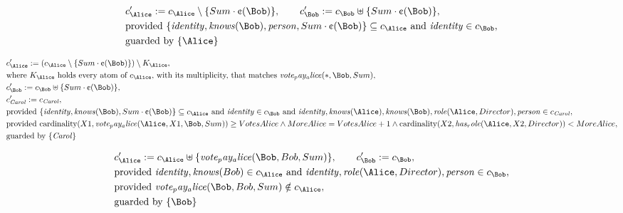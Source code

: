 \begin{align*}
&
c'_
{
\Alice
}
 := 
c_
{
\Alice
}
 \setminus 
\{
Sum
\cdot
\text{\textcent}
(
\Bob
)
\}
, \qquad 
c'_
{
\Bob
}
 := 
c_
{
\Bob
}
 \uplus 
\{
Sum
\cdot
\text{\textcent}
(
\Bob
)
\}
,\\
&
\text{provided } 
\{
\mathit{
identity
}
,
\mathit{
knows
}
(
\Bob
)
,
\mathit{
person
}
,
Sum
\cdot
\text{\textcent}
(
\Bob
)
\}
 \subseteq c_
{
\Alice
}
 \text{ and } 
\mathit{
identity
}
 \in c_
{
\Bob
}
,\\
&
\text{guarded by } \{
\Alice
\}
\end{align*}

\begin{align*}
&
c'_
{
\Alice
}
 := 
(c_
{
\Alice
}
 \setminus 
\{
Sum
\cdot
\text{\textcent}
(
\Bob
)
\}
) \setminus K_
{
\Alice
}
,\\
&
\text{where } K_
{
\Alice
}
 \text{ holds every atom of } c_
{
\Alice
}
 \text{, with its multiplicity, that matches } 
\mathit{
vote_pay_alice
}
(
\ast
,
\Bob
,
Sum
)
,\\
&
c'_
{
\Bob
}
 := 
c_
{
\Bob
}
 \uplus 
\{
Sum
\cdot
\text{\textcent}
(
\Bob
)
\}
,\\
&
c'_
{
\mathit{Carol}
}
 := 
c_
{
\mathit{Carol}
}
,\\
&
\text{provided } 
\{
\mathit{
identity
}
,
\mathit{
knows
}
(
\Bob
)
,
Sum
\cdot
\text{\textcent}
(
\Bob
)
\}
 \subseteq c_
{
\Alice
}
 \text{ and } 
\mathit{
identity
}
 \in c_
{
\Bob
}
 \text{ and } 
\mathit{
identity
}
,
\mathit{
knows
}
(
\Alice
)
,
\mathit{
knows
}
(
\Bob
)
,
\mathit{
role
}
(
\Alice
,
Director
)
,
\mathit{
person
}
 \in c_
{
\mathit{Carol}
}
,\\
&
\text{provided } 
\mathrm{cardinality}(
X1
,
\mathit{
vote_pay_alice
}
(
\Alice
,
X1
,
\Bob
,
Sum
)
)
\ge
VotesAlice
\land
MoreAlice
=
VotesAlice
+
1
\land
\mathrm{cardinality}(
X2
,
\mathit{
has_role
}
(
\Alice
,
X2
,
Director
)
)
<
MoreAlice
,\\
&
\text{guarded by } \{
\mathit{Carol}
\}
\end{align*}

\begin{align*}
&
c'_
{
\Alice
}
 := 
c_
{
\Alice
}
 \uplus 
\{
\mathit{
vote_pay_alice
}
(
\Bob
,
Bob
,
Sum
)
\}
, \qquad 
c'_
{
\Bob
}
 := 
c_
{
\Bob
}
,\\
&
\text{provided } 
\mathit{
identity
}
,
\mathit{
knows
}
(
Bob
)
 \in c_
{
\Alice
}
 \text{ and } 
\mathit{
identity
}
,
\mathit{
role
}
(
\Alice
,
Director
)
,
\mathit{
person
}
 \in c_
{
\Bob
}
,\\
&
\text{provided } 
\mathit{
vote_pay_alice
}
(
\Bob
,
Bob
,
Sum
)
 \notin c_
{
\Alice
}
,\\
&
\text{guarded by } \{
\Bob
\}
\end{align*}
